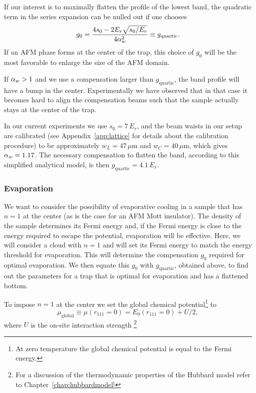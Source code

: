 If our interest is to maximally flatten the profile of the lowest band, the
quadratic term in the series expansion can be nulled out if one chooses
\begin{equation}
 g_{0} = \frac{  4 s_{0} - 2 E_{r}\sqrt{s_{0}/E_{r}} }{ 4  \alpha_{w} ^{2} }  
  \equiv g_{\text{quartic}} . 
\end{equation}
If an AFM phase forms at the center of the trap, this
choice of $g_{0}$ will be the most favorable to enlarge the size of the AFM
domain. 

If $ \alpha_{w}  > 1$ and we use a compensation larger than $g_{\text{quartic}}$,
the band profile will have a bump in the center.  Experimentally we have
observed that in that case it becomes hard to align the compensation beams such
that the sample actually stays at the center of the trap.

In our current experiments we use $s_{0}=7\,E_{r}$, and the beam waists in
our setup are calibrated (see Appendix~\ref{app:lattice} for details about the
calibration procedure) to be approximately $w_{L}=47\,\mu$m and
$w_{C}=40\,\mu$m, which gives $ \alpha_{w} =1.17$.  The necessary compensation to
flatten the band, according to this simplified analytical model, is then
$g_{\text{quartic}} =  4.1\,E_{r}$.


\subsubsection{Evaporation} 

We want to consider the possibility of evaporative cooling in a sample that has
$n=1$ at the center (as is the case for an AFM Mott insulator).   The density
of the sample determines its Fermi energy and, if the Fermi energy is close to
the energy required to escape the potential, evaporation will be effective.
Here, we will consider a cloud with $n=1$ and will set its Fermi energy to
match the energy threshold for evaporation.   This will determine the
compensation $g_{0}$ required for optimal evaporation.   We then equate this
$g_{0}$ with $g_{\mathrm{quartic}}$, obtained above, to find out the parameters
for a trap that is optimal for evaporation and has a flattened bottom. 

To impose $n=1$ at the center we set the global chemical potential\footnote{At
zero temperature the global chemical potential is equal to the Fermi energy.}
to 
\begin{equation}
  \mu_{\text{global}} \equiv \mu(r_{111}=0) = E_{0}(r_{111}=0) + U/2, 
\end{equation}
 where $U$ is the on-site interaction strength \footnote{ For a discussion of
the thermodynamic properties of the Hubbard model refer to
Chapter~\ref{chap:hubbardmodel}} 

